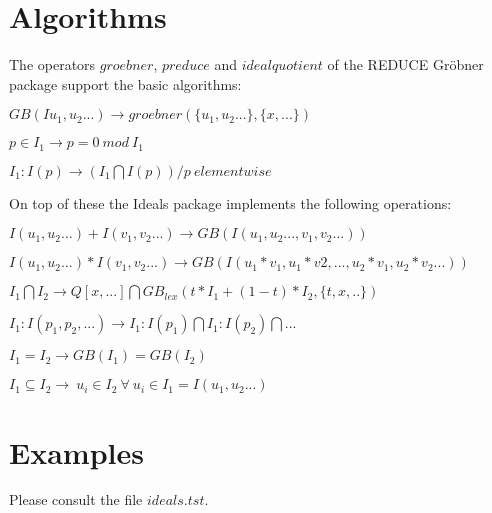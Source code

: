 \section{Algorithms}

The operators $groebner$, $preduce$ and $idealquotient$ of the
REDUCE Gr\"obner package support the basic algorithms:

$GB(Iu_1,u_2...) \rightarrow groebner(\{u_1,u_2...\},\{x,...\})$

$p \in I_1 \rightarrow p=0 \ mod \ I_1$

$I_1 : I(p) \rightarrow (I_1 \bigcap I(p)) / p \ elementwise$

\noindent
On top of these the Ideals package implements the following
operations:


$I(u_1,u_2...)+I(v_1,v_2...) \rightarrow GB(I(u_1,u_2...,v_1,v_2...))$


$I(u_1,u_2...)*I(v_1,v_2...)\rightarrow
 GB(I(u_1*v_1,u_1*v2,...,u_2*v_1,u_2*v_2...))$


$I_1 \bigcap I_2 \rightarrow
  Q[x,...] \bigcap GB_{lex}(t*I_1 + (1-t)*I_2,\{t,x,..\}) $


$I_1 : I(p_1,p_2,...) \rightarrow I_1 : I(p_1) \bigcap I_1 : I(p_2)
\bigcap ...$

$I_1 = I_2 \rightarrow GB(I_1)=GB(I_2)$

$I_1 \subseteq I_2
   \rightarrow \ u_i \in I_2 \ \forall \ u_i \in I_1=I(u_1,u_2...)$

\section{Examples}

Please consult the file $ideals.tst$.

